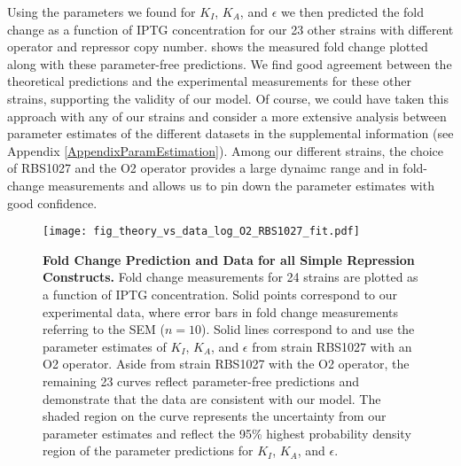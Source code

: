 Using the parameters we found for $K_I$, $K_A$, and $\epsilon$ we then predicted
the fold change as a function of IPTG concentration for our 23 other strains
with different operator and repressor copy number.  shows the
measured fold change plotted along with these parameter-free predictions. We
find good agreement between the theoretical predictions and the experimental
measurements for these other strains, supporting the validity of our model. Of
course, we could have taken this approach with any of our strains and  consider
a more extensive analysis between parameter estimates of the different datasets
in the supplemental information (see Appendix \ref{AppendixParamEstimation}).
 Among our different strains, the choice of RBS1027 and the O2 operator provides
a large dynaimc range and in fold-change measurements and allows us to pin down
the parameter estimates with good confidence. 

\begin{figure}[h]
	\centering
	\texttt{[image: fig\_theory\_vs\_data\_log\_O2\_RBS1027\_fit.pdf]}
	\caption{{\bf Fold Change Prediction and Data for all Simple Repression
			Constructs. } \tiny{ Fold
		change measurements for 24 strains are plotted  as a function of IPTG concentration. Solid points
		correspond to our experimental data, where error bars in fold change
		measurements referring to the SEM ($n=10$). Solid lines correspond to
		\eref[eq7] and use the parameter estimates of $K_I$, $K_A$, and $\epsilon$ from
		strain RBS1027 with an O2 operator. Aside from strain RBS1027 with the O2
		operator, the remaining 23 curves reflect parameter-free predictions and
		demonstrate that the data are consistent with our model. The shaded region on
		the curve represents the uncertainty from our parameter estimates and reflect
		the 95\% highest probability density region of the parameter predictions for
		$K_I$, $K_A$, and $\epsilon$.} } \label{fig_result2}
\end{figure}

